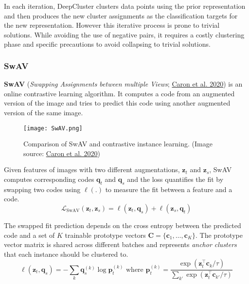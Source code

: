 \documentclass[12pt]{article}
\begin{document}
In each iteration, DeepCluster clusters data points using the prior representation and then produces the new cluster assignments as the classification targets for the new representation. However this iterative process is prone to trivial solutions. While avoiding the use of negative pairs, it requires a costly clustering phase and specific precautions to avoid collapsing to trivial solutions.

\subsubsection{SwAV}
\textbf{SwAV} (\emph{Swapping Assignments between multiple Views}; \href{https://arxiv.org/abs/2006.09882}{Caron et al. 2020}) is an online contrastive learning algorithm. It computes a code from an augmented version of the image and tries to predict this code using another augmented version of the same image.

\begin{figure}[H]
    \centering
    \texttt{[image: SwAV.png]}
    \caption{Comparison of SwAV and contrastive instance learning. (Image source: \href{https://arxiv.org/abs/2006.09882}{Caron et al. 2020})}
\end{figure}

Given features of images with two different augmentations, $\mathbf{z}_t$ and $\mathbf{z}_s$, SwAV computes corresponding codes $\mathbf{q}_t$ and $\mathbf{q}_s$ and the loss quantifies the fit by swapping two codes using $\ell(.)$ to measure the fit between a feature and a code.
\[
\mathcal{L}_\text{SwAV}(\mathbf{z}_t, \mathbf{z}_s) = \ell(\mathbf{z}_t, \mathbf{q}_s) + \ell(\mathbf{z}_s, \mathbf{q}_t)
\]

The swapped fit prediction depends on the cross entropy between the predicted code and a set of $K$ trainable prototype vectors $\mathbf{C} = \{\mathbf{c}_1, \dots, \mathbf{c}_K\}$. The prototype vector matrix is shared across different batches and represents \emph{anchor clusters} that each instance should be clustered to.
\[
\ell(\mathbf{z}_t, \mathbf{q}_s) = - \sum_k \mathbf{q}^{(k)}_s\log\mathbf{p}^{(k)}_t \text{ where } \mathbf{p}^{(k)}_t = \frac{\exp(\mathbf{z}_t^\top\mathbf{c}_k  / \tau)}{\sum_{k'}\exp(\mathbf{z}_t^\top \mathbf{c}_{k'} / \tau)}
\]
\end{document}
